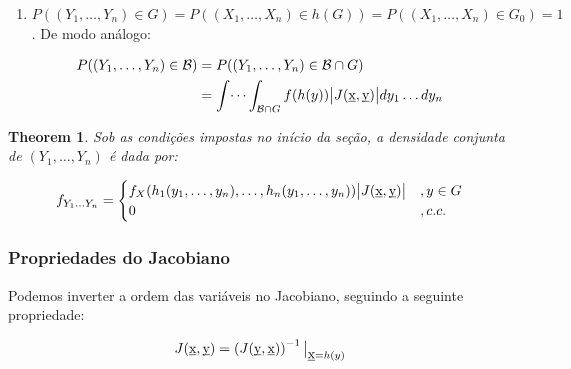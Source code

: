 \documentclass[
]{article}
\providecommand{\tightlist}{%
  \setlength{\itemsep}{0pt}\setlength{\parskip}{0pt}}
\newtheorem{theorem}{Theorem}[section]
\theoremstyle{definition}
\theoremstyle{definition}
\theoremstyle{definition}
\theoremstyle{definition}
\theoremstyle{remark}
\begin{document}
\begin{enumerate}
\def\labelenumi{\arabic{enumi}.}
\setcounter{enumi}{1}
\tightlist
\item
  \(P((Y_{1},\ldots,Y_{n}) \in G) = P((X_{1}, \ldots, X_{n}) \in h(G)) = P((X_{1}, \ldots, X_{n}) \in G_{0}) = 1\). De modo análogo:
\end{enumerate}

\begin{align*}
P((Y_{1}, \ldots, Y_{n}) \in \mathcal{B}) &= P((Y_{1}, \ldots, Y_{n}) \in \mathcal{B} \cap G) \\
&= \int \dots \int_{\mathcal{B} \cap G}f(h(y))\big{|}J(\underbar{x},\underbar{y})\big{|}dy_{1} \ldots dy_{n}
\end{align*}

\begin{theorem}
Sob as condições impostas no início da seção, a densidade conjunta de \((Y_{1}, \ldots, Y_{n})\) é dada por:

\begin{equation*}
f_{Y_{1}\ldots Y_{n}} = \begin{cases}
f_{X}(h_{1}(y_{1},\ldots,y_{n}), \ldots, h_{n}(y_{1},\ldots,y_{n}))\big{|}J(\underbar{x},\underbar{y})\big{|} & ,y \in G \\
0 & ,c.c.
\end{cases}
\end{equation*}
\end{theorem}

\hypertarget{propriedades-do-jacobiano}{%
\subsubsection{Propriedades do Jacobiano}\label{propriedades-do-jacobiano}}

Podemos inverter a ordem das variáveis no Jacobiano, seguindo a seguinte propriedade:

\begin{equation}
J(\underbar{x},\underbar{y}) = \left(J(\underbar{y},\underbar{x})\right)^{-1}\big{|}_{\underbar{x} = h(y)}
\label{eq:inversajacobiano}
\end{equation}
\end{document}
